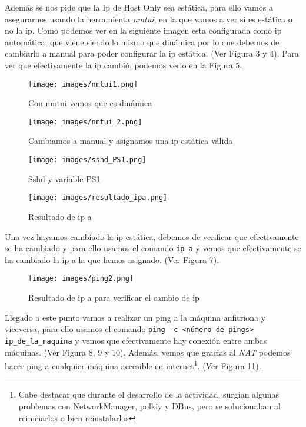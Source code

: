 \documentclass[a4paper,12pt]{article}
\begin{document}
Además se nos pide que la Ip de Host Only sea estática, para ello vamos a asegurarnos usando la herramienta \textit{nmtui}, en la que vamos a ver si es estática o no la ip. Como podemos ver en la siguiente imagen esta configurada como ip automática, que viene siendo lo mismo que dinámica por lo que debemos de cambiarlo a manual para poder configurar la ip estática. (Ver Figura 3 y 4). Para ver que efectivamente la ip cambió, podemos verlo en la Figura 5.
\begin{figure}[htbp]
    \centering
    \begin{minipage}[b]{0.45\textwidth}
        \centering
        \texttt{[image: images/nmtui1.png]}
        \caption{Con nmtui vemos que es dinámica}
        \label{fig:ejercicio1}
    \end{minipage}
    \hfill
    \begin{minipage}[b]{0.45\textwidth}
        \centering
        \texttt{[image: images/nmtui\_2.png]}
        \caption{Cambiamos a manual y asignamos una ip estática válida}
        \label{fig:ejercicio1_vbox}
    \end{minipage}
\end{figure}



\begin{figure}
    \centering
    \texttt{[image: images/sshd\_PS1.png]}
    \caption{Sshd y variable PS1}
    \label{fig:ejercicio1_1}
\end{figure}

\begin{figure}
    \centering
    \texttt{[image: images/resultado\_ipa.png]}
    \caption{Resultado de ip a}
    \label{fig:ejercicio1_2}
\end{figure}

Una vez hayamos cambiado la ip estática, debemos de verificar que efectivamente se ha cambiado y para ello usamos el comando \texttt{ip a} y vemos que efectivamente se ha cambiado la ip a la que hemos asignado. (Ver Figura 7).

\begin{figure}
    \centering
    \texttt{[image: images/ping2.png]}
    \caption{Resultado de ip a para verificar el cambio de ip}
    \label{fig:ejercicio1_2}
\end{figure}

Llegado a este punto vamos a realizar un ping a la máquina anfitriona y viceversa, para ello usamos el comando \texttt{ping -c <número de pings> ip\_de\_la\_maquina} y vemos que efectivamente hay conexión entre ambas máquinas. (Ver Figura 8, 9 y 10). Además, vemos que gracias al \textit{NAT} podemos hacer ping a cualquier máquina accesible en internet\footnote{Cabe destacar que durante el desarrollo de la actividad, surgían algunas problemas con NetworkManager, polkiy y DBus, pero se solucionaban al reiniciarlos o bien reinstalarlos}. (Ver Figura 11).
\end{document}
